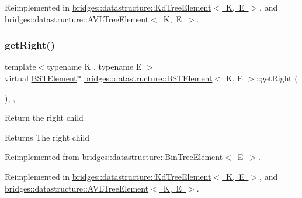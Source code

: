Reimplemented in \mbox{\hyperlink{classbridges_1_1datastructure_1_1_kd_tree_element_a653597918fbc6e31b84fcf8dbdf67122}{bridges\+::datastructure\+::\+Kd\+Tree\+Element$<$ K, E $>$}}, and \mbox{\hyperlink{classbridges_1_1datastructure_1_1_a_v_l_tree_element_a4a639e0c623435aadf5c51ed132cb25d}{bridges\+::datastructure\+::\+A\+V\+L\+Tree\+Element$<$ K, E $>$}}.

\mbox{\label{classbridges_1_1datastructure_1_1_b_s_t_element_a80f5085d6d03805dd3091b7693d8e235}} 
\subsubsection{\texorpdfstring{getRight()}{getRight()}\hspace{0.1cm}{\footnotesize\ttfamily [1/2]}}
{\footnotesize\ttfamily template$<$typename K , typename E $>$ \\
virtual \mbox{\hyperlink{classbridges_1_1datastructure_1_1_b_s_t_element}{B\+S\+T\+Element}}$\ast$ \mbox{\hyperlink{classbridges_1_1datastructure_1_1_b_s_t_element}{bridges\+::datastructure\+::\+B\+S\+T\+Element}}$<$ K, E $>$\+::get\+Right (\begin{DoxyParamCaption}{ }\end{DoxyParamCaption})\hspace{0.3cm}{\ttfamily [inline]}, {\ttfamily [override]}, {\ttfamily [virtual]}}

Return the right child \begin{DoxyReturn}{Returns}
The right child 
\end{DoxyReturn}


Reimplemented from \mbox{\hyperlink{classbridges_1_1datastructure_1_1_bin_tree_element_ae1e6bde8cc03cf5da5a7930354fdf592}{bridges\+::datastructure\+::\+Bin\+Tree\+Element$<$ E $>$}}.



Reimplemented in \mbox{\hyperlink{classbridges_1_1datastructure_1_1_kd_tree_element_a366e3b0987169220d3a145043be2373d}{bridges\+::datastructure\+::\+Kd\+Tree\+Element$<$ K, E $>$}}, and \mbox{\hyperlink{classbridges_1_1datastructure_1_1_a_v_l_tree_element_aed585fdf56fcbfebac6cd0262c9c1807}{bridges\+::datastructure\+::\+A\+V\+L\+Tree\+Element$<$ K, E $>$}}.


